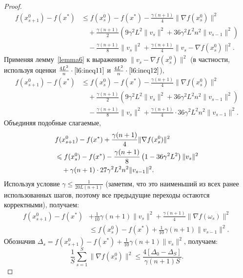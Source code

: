 \begin{theorem}
\begin{proof}
        \begin{align*}
            f(x_{s+1}^0) - f(x^*) &\leqslant f(x_s^0) - f(x^*) - \frac{\gamma(n+1)}{4}\|\nabla f(x_s^0)\|^2 \\
           & \quad  + \frac{\gamma(n+1)}{2}\left(9\gamma^2L^2\|v_{s}\|^2 + 36\gamma^2L^2n^2\|v_{s-1}\|^2\right) \\
            & \quad- \frac{\gamma(n+1)}{8}\|v_s\|^2 + \frac{\gamma(n+1)}{4}\|v_s - \nabla f(x_s^0)\|^2.
            \end{align*}
Применяя лемму~\ref{lemma6} к выражению \(\|v_s - \nabla f(x_s^0)\|^2\) (в частности, используя оценки \(\frac{4L^2}{n} \cdot \eqref{l6:ineq11}\) и \(\frac{4L^2}{n} \cdot \eqref{l6:ineq12}\)),
        \begin{align*}
            f(x_{s+1}^0) - f(x^*) &\leqslant f(x_s^0) - f(x^*) - \frac{\gamma(n+1)}{4}\|\nabla f(x_s^0)\|^2 \\
            & \quad + \frac{\gamma(n+1)}{2}\left(9\gamma^2L^2\|v_{s}\|^2 + 36\gamma^2L^2n^2\|v_{s-1}\|^2\right) \\
            & \quad- \frac{\gamma(n+1)}{8}\|v_s\|^2 + \frac{\gamma(n+1)}{4}\cdot 36\gamma^2L^2n^2\|v_{s-1}\|^2.
        \end{align*}
Объединяя подобные слагаемые,
        \begin{align}
            \notag &f(x_{s+1}^0) - f(x^*) + \frac{\gamma(n+1)}{4}\|\nabla f(x_s^0)\|^2 \\ \notag &\leqslant f(x_s^0) - f(x^*) - \frac{\gamma(n+1)}{8}\left(1 - 36 \gamma^2L^2\right)\|v_s\|^2 \\ 
            \label{t3:ineq1}& \quad + \gamma(n+1)\cdot 27\gamma^2L^2n^2\|v_{s-1}\|^2. 
        \end{align}
Используя условие \(\gamma \leqslant \frac{1}{20L(n+1)}\) (заметим, что это наименьший из всех ранее использованных шагов, поэтому все предыдущие переходы остаются корректными), получаем:
        \begin{align*}
            f(x_{s+1}^0) - f(x^*) &+ \frac{1}{10}\gamma(n+1)\|v_s\|^2 + \frac{\gamma(n+1)}{4}\|\nabla f(\omega_s)\|^2\\
            &\leqslant f(x_s^0) - f(x^*) + \frac{1}{10}\gamma(n+1)\|v_{s-1}\|^2.
        \end{align*}
Обозначив \(\Delta_{s} = f(x_{s+1}^0) - f(x^*) + \frac{1}{10}\gamma(n+1)\|v_{s}\|^2\), получаем:
        \begin{equation*}
            \frac{1}{S}\sum\limits_{s=1}^{S} \|\nabla f(x_s^0)\|^2 \leqslant \frac{4\left[\Delta_0 - \Delta_{S}\right]}{\gamma(n+1)S}.

\end{equation*}
\end{proof}
\end{theorem}
